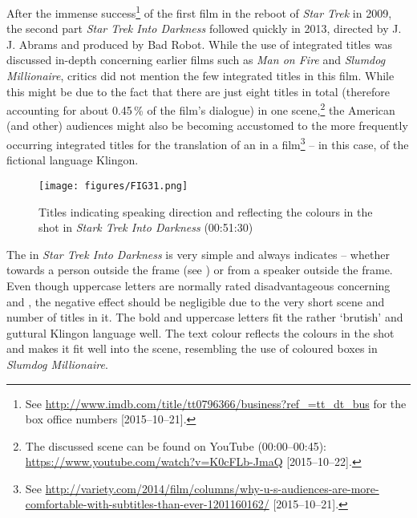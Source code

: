 After the immense success\footnote{See \url{http://www.imdb.com/title/tt0796366/business?ref\_=tt\_dt\_bus} for the box office numbers [2015--10--21].} of the first film in the reboot of \textit{Star Trek} in 2009, the second part \textit{Star Trek Into Darkness} followed quickly in 2013, directed by J. J. Abrams and produced by Bad Robot. While the use of integrated titles was discussed in-depth concerning earlier films such as \textit{Man on Fire} and \textit{Slumdog Millionaire}, critics did not mention the few integrated titles in this film. While this might be due to the fact that there are just eight titles in total (therefore accounting for about 0.45\,\% of the film’s dialogue) in one scene,\footnote{The discussed scene can be found on YouTube (00:00--00:45): \url{https://www.youtube.com/watch?v=K0cFLb-JmaQ} [2015--10--22].} the American (and other) audiences might also be becoming accustomed to the more frequently occurring integrated titles for the translation of an  in a film\footnote{See\,\,\url{http://variety.com/2014/film/columns/why-u-s-audiences-are-more-comfortable-with-subtitles-than-ever-1201160162/} [2015--10--21].} – in this case, of the fictional language Klingon.

\begin{figure}[t]
\texttt{[image: figures/FIG31.png]}
\caption{Titles indicating speaking direction and reflecting the colours in the shot in \textit{Stark Trek Into Darkness} (00:51:30)}
\label{fig:FIG31}
\end{figure}

\largerpage
The  in \textit{Star Trek Into Darkness} is very simple and always indicates  – whether towards a person outside the frame (see ) or from a speaker outside the frame. Even though uppercase letters are normally rated disadvantageous concerning  and  \citep{Liebig????}, the negative effect should be negligible due to the very short scene and number of titles in it. The bold  and uppercase letters fit the rather ‘brutish’ and guttural Klingon language well. The text colour reflects the colours in the shot and makes it fit well into the scene, resembling the use of coloured boxes in \textit{Slumdog Millionaire}.


